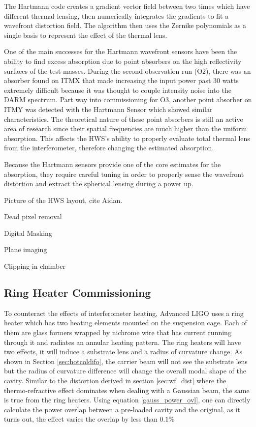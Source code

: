 	The Hartmann code creates a gradient vector field between two times which have different thermal lensing, then numerically integrates the gradients to fit a wavefront distortion field.  The algorithm then uses the Zernike polynomials as a single basis to represent the effect of the thermal lens.
	
	One of the main successes for the Hartmann wavefront sensors have been the ability to find excess absorption due to point absorbers on the high reflectivity surfaces of the test masses.  During the second observation run (O2), there was an absorber found on ITMX that made increasing the input power past 30 watts extremely difficult because it was thought to couple intensity noise into the DARM spectrum.  Part way into commissioning for O3, another point absorber on ITMY was detected with the Hartmann Sensor which showed similar characteristics.  The theoretical nature of these point absorbers is still an active area of research since their spatial frequencies are much higher than the uniform absorption.  This affects the HWS's ability to properly evaluate total thermal lens from the interferometer, therefore changing the estimated absorption.
	
	Because the Hartmann sensors provide one of the core estimates for the absorption, they require careful tuning in order to properly sense the wavefront distortion and extract the spherical lensing during a power up.
	
	Picture of the HWS layout, cite Aidan.
	
	Dead pixel removal
	
	Digital Masking
	
	Plane imaging
	
	Clipping in chamber
	
	\cite{AWC_current}
	
	\subsection{Ring Heater Commissioning}\label{Sec:RH}
	To counteract the effects of interferometer heating, Advanced LIGO uses a ring heater \cite{ramette_analytical} \cite{wang_thermalmodel} which has two heating elements mounted on the suspension cage. Each of them are glass formers wrapped by nichrome wire that has current running through it and radiates an annular heating pattern. The ring heaters will have two effects, it will induce a substrate lens and a radius of curvature change.  As shown in Section \ref{sec:hotcoldifo}, the carrier beam will not see the substrate lens but the radius of curvature difference will change the overall modal shape of the cavity.  Similar to the distortion derived in section \ref{sec:wf_dist} where the thermo-refractive effect dominates when dealing with a Gaussian beam, the same is true from the ring heaters. Using equation \ref{gauss_power_ovl}, one can directly calculate the power overlap between a pre-loaded cavity and the original, as it turns out, the effect varies the overlap by less than $0.1\%$

